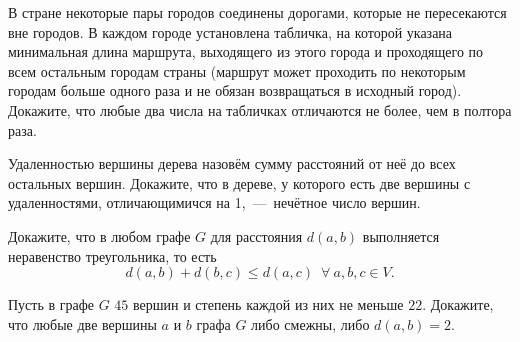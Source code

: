 \begin{exersize}
	В стране некоторые пары городов соединены дорогами, которые не пересекаются вне городов. В каждом городе установлена табличка, на которой указана минимальная длина маршрута, выходящего из этого города и проходящего по всем остальным городам страны (маршрут может проходить по некоторым городам больше одного раза и не обязан возвращаться в исходный город). Докажите, что любые два числа на табличках отличаются не более, чем в полтора раза.
\end{exersize}	  

\begin{exersize}
	Удаленностью вершины дерева назовём сумму расстояний от неё до всех остальных вершин. Докажите, что в дереве, у которого есть две вершины с удаленностями, отличающимичся на 1,~---~нечётное число вершин.
\end{exersize}	

\begin{exersize}
	Докажите, что в любом графе $G$ для расстояния $d(a, b)$ выполняется неравенство треугольника, то есть 
	$$d(a, b) + d(b, c) \leqslant d(a,c) \;\ \forall \!\ a, b, c \in V.$$
\end{exersize}	

\begin{exersize}
	Пусть в графе $G$ $45$ вершин и степень каждой из них не меньше $22$. Докажите, что любые две вершины $a$ и $b$ графа $G$ либо смежны, либо $d (a, b) = 2$. 
\end{exersize}	